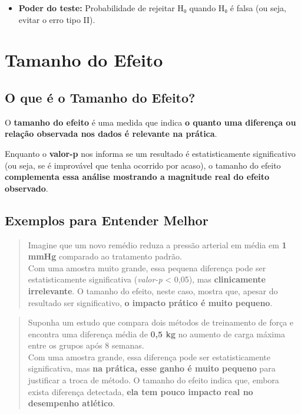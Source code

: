 \documentclass[
]{book}
\providecommand{\tightlist}{%
  \setlength{\itemsep}{0pt}\setlength{\parskip}{0pt}}
\begin{document}
\begin{itemize}
\tightlist
\item
  \textbf{Poder do teste:} Probabilidade de rejeitar H₀ quando H₀ é falsa (ou seja, evitar o erro tipo II).
\end{itemize}

\section{Tamanho do Efeito}\label{tamanho-do-efeito}

\subsection{O que é o Tamanho do Efeito?}\label{o-que-uxe9-o-tamanho-do-efeito}

O \textbf{tamanho do efeito} é uma medida que indica \textbf{o quanto uma diferença ou relação observada nos dados é relevante na prática}.

Enquanto o \textbf{valor-p} nos informa se um resultado é estatisticamente significativo (ou seja, se é improvável que tenha ocorrido por acaso), o tamanho do efeito \textbf{complementa essa análise mostrando a magnitude real do efeito observado}.

\subsection{Exemplos para Entender Melhor}\label{exemplos-para-entender-melhor}

\begin{quote}
Imagine que um novo remédio reduza a pressão arterial em média em \textbf{1 mmHg} comparado ao tratamento padrão.\\
Com uma amostra muito grande, essa pequena diferença pode ser estatisticamente significativa (\emph{valor-p} \textless{} 0,05), mas \textbf{clinicamente irrelevante}. O tamanho do efeito, neste caso, mostra que, apesar do resultado ser significativo, \textbf{o impacto prático é muito pequeno}.
\end{quote}

\begin{quote}
Suponha um estudo que compara dois métodos de treinamento de força e encontra uma diferença média de \textbf{0,5 kg} no aumento de carga máxima entre os grupos após 8 semanas.\\
Com uma amostra grande, essa diferença pode ser estatisticamente significativa, mas \textbf{na prática, esse ganho é muito pequeno} para justificar a troca de método. O tamanho do efeito indica que, embora exista diferença detectada, \textbf{ela tem pouco impacto real no desempenho atlético}.
\end{quote}
\end{document}
